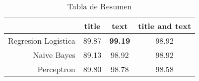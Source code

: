 \begin{table}
\centering
\caption{Tabla de Resumen}
\label{tab:resumen}
\begin{tabular}{rccc}
\toprule
{} &  title &   text &  title and text \\
\midrule
Regresion Logistica &  89.87 &  \textbf{99.19} &           98.92 \\
Naive Bayes         &  89.13 &  98.92 &           98.92 \\
Perceptron          &  89.80 &  98.78 &           98.58 \\
\bottomrule
\end{tabular}
\end{table}
